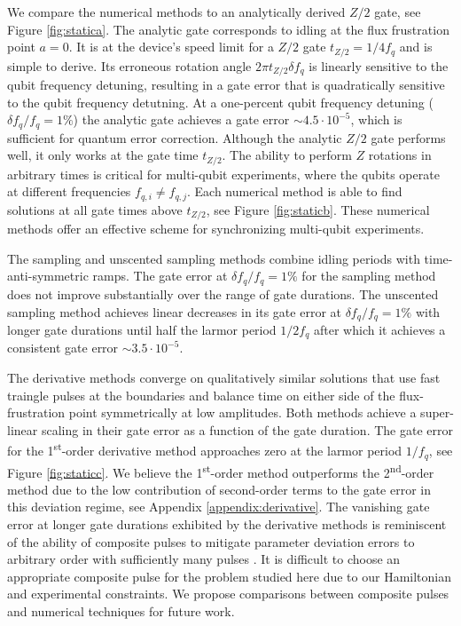 We compare the numerical methods
to an analytically derived $Z/2$ gate, see Figure \ref{fig:statica}. 
The analytic gate corresponds to
idling at the flux frustration point $a = 0$. It
is at the device's speed limit for a $Z/2$ gate $t_{Z/2} = 1 / 4 f_{q}$ and
is simple to derive. Its erroneous rotation angle $2 \pi t_{Z/2} \delta f_{q}$ is linearly sensitive to
the qubit frequency detuning, resulting in a gate error that is quadratically sensitive
to the qubit frequency detutning.
At a one-percent
qubit frequency detuning ($\delta f_{q} / f_{q} = 1\%$)
the analytic gate achieves a gate error $\sim 4.5 \cdot 10^{-5}$,
which is sufficient for quantum error correction.
Although the analytic $Z/2$ gate performs well, it
only works at the gate time $t_{Z/2}$. The ability to perform $Z$ rotations in arbitrary times is critical
for multi-qubit experiments, where the qubits operate at different frequencies $f_{q, i} \neq f_{q, j}$.
Each numerical method is able to find solutions at
all gate times above $t_{Z/2}$, see Figure \ref{fig:staticb}.
These numerical methods offer an effective scheme for synchronizing
multi-qubit experiments.

The sampling and unscented sampling methods combine idling periods
with time-anti-symmetric ramps.
The gate error at $\delta f_{q} / f_{q} = 1\%$ for the sampling method
does not improve substantially over the
range of gate durations. The unscented sampling method
achieves linear decreases in its gate error at $\delta f_{q} / f_{q} = 1\%$ with longer gate durations
until half the larmor period $1 / 2 f_{q}$ after which it achieves a consistent
gate error $\sim 3.5 \cdot 10^{-5}$.

The derivative methods converge on qualitatively similar solutions that
use fast traingle pulses at the boundaries and balance time
on either side of the flux-frustration point symmetrically at low amplitudes.
Both methods achieve a super-linear scaling in their gate error as
a function of the gate duration. The gate error for the 1\textsuperscript{st}-order
derivative method approaches zero at the larmor period $1 / f_{q}$, see Figure \ref{fig:staticc}.
We believe the 1\textsuperscript{st}-order method outperforms the 2\textsuperscript{nd}-order
method due to the low contribution of second-order
terms to the gate error in this deviation regime, see Appendix \ref{appendix:derivative}.
The vanishing gate error at longer gate durations exhibited by the derivative methods
is reminiscent of the
ability of composite pulses to mitigate parameter deviation errors to arbitrary
order with sufficiently many pulses \cite{merrill2014progress}.
It is difficult to choose an appropriate composite pulse
for the problem studied here due to our Hamiltonian and experimental constraints.
We propose comparisons between composite pulses and numerical techniques
for future work.

